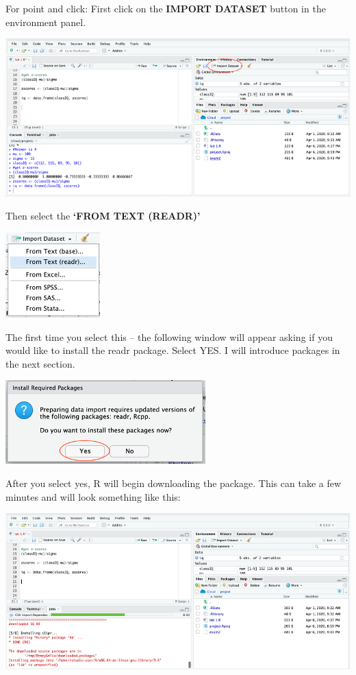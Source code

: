 \documentclass[
]{book}
\begin{document}
For point and click:
First click on the \textbf{IMPORT DATASET} button in the environment panel.

\includegraphics{img/import.png}

Then select the \textbf{`FROM TEXT (READR)'}

\includegraphics{img/readrbox.png}

The first time you select this -- the following window will appear asking if you would like to install the readr package. Select YES. I will introduce packages in the next section.

\includegraphics{img/installreadrbox.png}

After you select yes, R will begin downloading the package. This can take a few minutes and will look something like this:

\includegraphics{img/installreadr.png}
\end{document}
